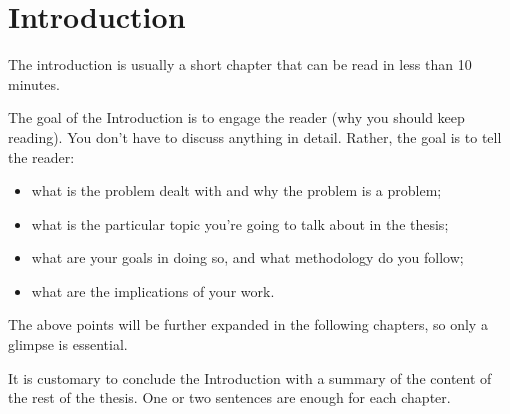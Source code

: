 
\chapter{Introduction}

The introduction is usually a short chapter that can be read in less than 10 minutes.

The goal of the Introduction is to engage the reader (why you should keep reading).
You don't have to discuss anything in detail. Rather, the goal is to tell the reader:
\begin{itemize}
  \item what is the problem dealt with and why the problem is a problem;
  \item what is the particular topic you're going to talk about in the thesis;
  \item what are your goals in doing so, and what methodology do you follow;
  \item what are the implications of your work.
\end{itemize}

The above points will be further expanded in the following chapters, so only a glimpse is essential. 

\medskip

It is customary to conclude the Introduction with a summary of the content of the rest of the thesis. One or two sentences are enough for each chapter.